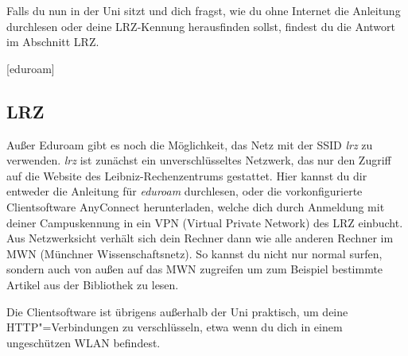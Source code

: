 Falls du nun in der Uni sitzt und dich fragst, wie du ohne Internet
die Anleitung durchlesen oder deine LRZ-Kennung herausfinden sollst, 
findest du die Antwort im Abschnitt LRZ.
\begin{urlList}
	[eduroam]
\end{urlList}

\subsection*{LRZ}
Außer Eduroam gibt es noch die Möglichkeit, das Netz mit der SSID
\emph{lrz} zu verwenden. \emph{lrz} ist zunächst ein unverschlüsseltes
Netzwerk, das nur den Zugriff auf die Website des
Leibniz-Rechen\-zentrums gestattet. Hier kannst du dir entweder die 
Anleitung für \mbox{\emph{eduroam}} durchlesen, oder die
vorkonfigurierte Clientsoftware AnyConnect herunterladen, welche dich
durch Anmeldung mit deiner Campuskennung in ein VPN (Virtual Private
Network) des LRZ einbucht. Aus Netzwerksicht verhält sich dein Rechner
dann wie alle anderen Rechner im MWN (Münchner Wissenschaftsnetz). So
kannst du nicht nur normal surfen, sondern auch von außen auf das
MWN zugreifen um zum Beispiel bestimmte Artikel aus der Bibliothek zu lesen.

Die Clientsoftware ist übrigens außerhalb der Uni praktisch, um deine
HTTP"=Verbindungen zu verschlüsseln, etwa wenn du dich in einem
ungeschützen WLAN befindest.

%
